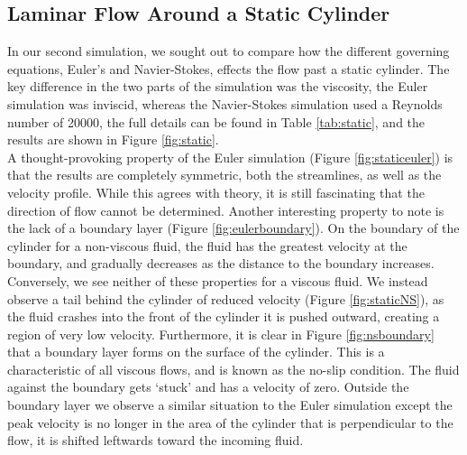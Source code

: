 \documentclass[10pt, titlepage]{article}
\begin{document}
\subsection{Laminar Flow Around a Static Cylinder}

In our second simulation, we sought out to compare how the different governing equations, Euler's and Navier-Stokes, effects the flow past a static cylinder. The key difference in the two parts of the simulation was the viscosity, the Euler simulation was inviscid, whereas the Navier-Stokes simulation used a Reynolds number of 20000, the full  details can be found in Table \ref{tab:static}, and the results are shown in Figure \ref{fig:static}. \\

A thought-provoking property of the Euler simulation (Figure \ref{fig:staticeuler}) is that the results are completely symmetric, both the streamlines, as well as the velocity profile. While this agrees with theory, it is still fascinating that the direction of flow cannot be determined. Another interesting property to note is the lack of a boundary layer (Figure \ref{fig:eulerboundary}). On the boundary of the cylinder for a non-viscous fluid, the fluid has the greatest velocity at the boundary, and gradually decreases as the distance to the boundary increases. \\

Conversely, we see neither of these properties for a viscous fluid. We instead observe a tail behind the cylinder of reduced velocity (Figure \ref{fig:staticNS}), as the fluid crashes into the front of the cylinder it is pushed outward, creating a region of very low velocity. Furthermore, it is clear in Figure \ref{fig:nsboundary} that a boundary layer forms on the surface of the cylinder. This is a characteristic of all viscous flows, and is known as the no-slip condition. The fluid against the boundary gets `stuck' and has a velocity of zero. Outside the boundary layer we observe a similar situation to the Euler simulation except the peak velocity is no longer in the area of the cylinder that is perpendicular to the flow, it is shifted leftwards toward the incoming fluid.
\end{document}
